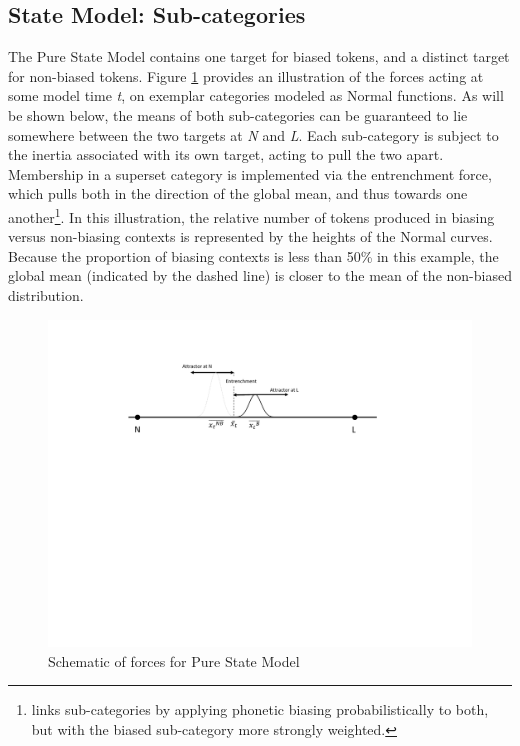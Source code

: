 \subsection{\label{subsec:Lengthening-as-State}State Model: Sub-categories}

The Pure State Model contains one target for biased tokens, and a
distinct target for non-biased tokens. Figure \ref{fig:Model G} provides
an illustration of the forces acting at some model time \emph{t},
on exemplar categories modeled as Normal functions. As will be shown
below, the means of both sub-categories can be guaranteed to lie somewhere
between the two targets at \emph{N} and \emph{L}. Each sub-category
is subject to the inertia associated with its own target, acting to
pull the two apart. Membership in a superset category is implemented
via the entrenchment force, which pulls both in the direction of the
global mean, and thus towards one another\footnote{\citet{soskuthy2013phonetic} links sub-categories by applying phonetic
biasing probabilistically to both, but with the biased sub-category
more strongly weighted. }. In this illustration, the relative number of tokens produced in
biasing versus non-biasing contexts is represented by the heights
of the Normal curves. Because the proportion of biasing contexts is
less than 50\% in this example, the global mean (indicated by the
dashed line) is closer to the mean of the non-biased distribution. 

\begin{figure}[H]
\begin{centering}
\includegraphics[scale=0.5]{figures/Model6Behavior.pdf}\caption{\label{fig:Model G}Schematic of forces for Pure State Model}
\par\end{centering}
\end{figure}

